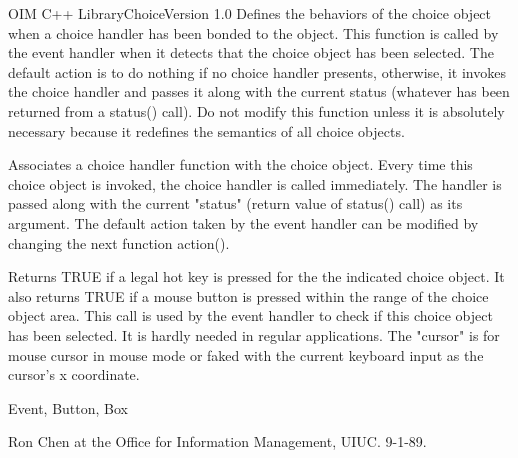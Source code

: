 \begin{manpage}{OIM C++ Library}{Choice}{Version 1.0}
    Defines the behaviors of the choice object when a choice handler
    has been bonded to the object.  This function is called by the
    event handler when it detects that the choice object has been
    selected.  The default action is to do nothing if no choice handler
    presents, otherwise, it invokes the choice handler 
    and passes it along with the current status 
    (whatever has been returned from a status() call).  
    Do not modify this function unless it is absolutely necessary because
    it redefines the semantics of all choice objects.

    Associates a choice handler function with the choice object.  Every
    time this choice object is invoked, the choice handler is called
    immediately.  
    The handler is passed along with the current "status"
    (return value of status() call) as its argument. The default 
    action taken by the event handler can be modified by changing
    the next function action().

    Returns TRUE if a legal hot key is pressed for the
    the indicated choice object. It also returns TRUE if 
    a mouse button is pressed within the range of the choice object area.
    This call is used by the event handler to check if this choice object
    has been selected.  It is hardly needed in regular applications.
    The "cursor" is for mouse cursor in mouse mode or faked with the
    current keyboard input as the cursor's x coordinate.

\subtitle{See Also}
     Event, Button, Box

\subtitle{Author}
    Ron Chen at the Office for Information Management, UIUC. 9-1-89.

\end{manpage}
\newpage
